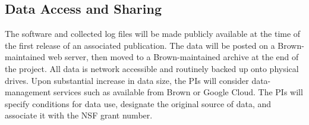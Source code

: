 \subsection*{Data Access and Sharing}

The software and collected log files will be made publicly available
at the time of the first release of an associated publication. The
data will be posted on a Brown-maintained web server, then moved to a
Brown-maintained archive at the end of the project. All data is
network accessible and routinely backed up onto physical drives. Upon
substantial increase in data size, the PIs will consider
data-management services such as available from Brown or Google
Cloud. The PIs will specify conditions for data use, designate the
original source of data, and associate it with the NSF grant number.
